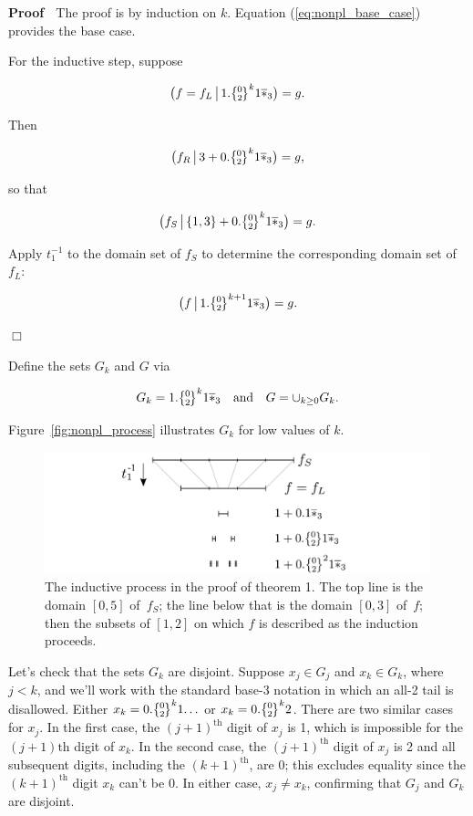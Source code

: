 \documentclass[20pt,]{extarticle}
\begin{document}
\textbf{Proof} \(\;\) The proof is by induction on \(k\). Equation
(\ref{eq:nonpl_base_case}) provides the base case.

For the inductive step, suppose

\[\big(f=f_L \restrict 1.\zerotwo^k1\lstar \big) = g.\]

Then

\[\big(f_R \restrict 3 + 0.\zerotwo^k1\lstar \big) = g,\]

so that

\[\big(f_S \restrict \{1,3\} + 0.\zerotwo^k1\lstar \big) = g.\]

Apply \(t_1^{-1}\) to the domain set of \(f_S\) to determine the
corresponding domain set of \(f_L\):

\[\big(f \restrict 1.\zerotwo^{k+1}1\lstar \big) = g.\]

\hfill\(\Box\)

Define the sets \(G_k\) and \(G\) via

\begin{equation}G_k = 1.\zerotwo^k1\lstar \quad\text{and}\quad
  G = \cup_{k \ge 0}G_k.\label{eq:Gk_G}\end{equation}

Figure~\ref{fig:nonpl_process} illustrates \(G_k\) for low values of
\(k\).

\begin{figure}[htbp]
\centering
\includegraphics{images/pdfs/nonpl_process.pdf}
\caption{\label{fig:nonpl_process}The inductive process in the proof of
theorem 1. The top line is the domain \([0,5]\) of \(\,f_S\); the line
below that is the domain \([0,3]\) of \(\,f;\) then the subsets of
\([1,2]\) on which \(f\) is described as the induction
proceeds.}\label{fig:nonplux5fprocess}
\end{figure}

Let's check that the sets \(G_k\) are disjoint. Suppose \(x_j\in G_j\)
and \(x_k\in G_k\), where \(j < k\), and we'll work with the standard
base-3 notation in which an all-2 tail is disallowed. Either
\(x_k=0.\zerotwo^k1\!\ldots\) or \(x_k=0.\zerotwo^k2\). There are two
similar cases for \(x_j\). In the first case, the \((j+1)^\text{th}\)
digit of \(x_j\) is 1, which is impossible for the \((j+1)\text{th}\)
digit of \(x_k\). In the second case, the \((j+1)^\text{th}\) digit of
\(x_j\) is 2 and all subsequent digits, including the
\((k+1)^\text{th}\), are 0; this excludes equality since the
\((k+1)^\text{th}\) digit \(x_k\) can't be 0. In either case,
\(x_j\ne x_k\), confirming that \(G_j\) and \(G_k\) are disjoint.
\end{document}
